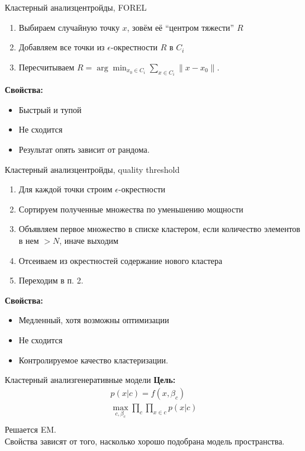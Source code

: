 \documentclass[14pt, fleqn, xcolor={dvipsnames, table}]{beamer}
\begin{document}
\begin{frame}{Кластерный анализ}{центройды, FOREL}
\begin{enumerate}
  \item Выбираем случайную точку $x$, зовём её ``центром тяжести'' $R$
  \item Добавляем все точки из $\epsilon$-окрестности $R$ в $C_i$
  \item Пересчитываем $R = \arg \min_{x_0 \in C_i}\sum_{x\in C_i} \|x - x_0\|$.
\end{enumerate}
\textbf{Свойства:} 
\begin{itemize}
  \item Быстрый и тупой
  \item Не сходится
  \item Результат опять зависит от рандома.
\end{itemize}
\end{frame}

\begin{frame}{Кластерный анализ}{центройды, quality threshold}
\footnotesize
\begin{enumerate}
  \item Для каждой точки строим $\epsilon$-окрестности
  \item Сортируем полученные множества по уменьшению мощности
  \item Объявляем первое множество в списке кластером, если количество элементов в нем $> N$, иначе выходим
  \item Отсеиваем из окрестностей содержание нового кластера
  \item Переходим в п. 2.
\end{enumerate}
\textbf{Свойства:} 
\begin{itemize}
  \item Медленный, хотя возможны оптимизации
  \item Не сходится
  \item Контролируемое качество кластеризации.
\end{itemize}
\end{frame}

\begin{frame}{Кластерный анализ}{генеративные модели}
\textbf{Цель:} 
$$\begin{array}{l}
  p(x|c) = f(x, \beta_c) \\
  \max_{c, \beta_c}\prod_c \prod_{x\in c} p(x|c) \\
\end{array}$$
Решается EM. \\
Свойства зависят от того, насколько хорошо подобрана модель пространства. \\
\end{frame}
\end{document}
